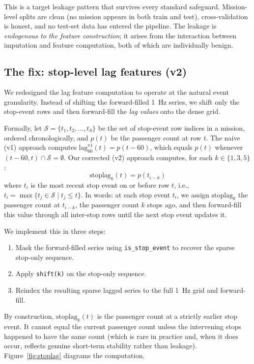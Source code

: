 This is a target leakage pattern that survives every standard safeguard.
Mission-level splits are clean (no mission appears in both train and test),
cross-validation is honest, and no test-set data has entered the pipeline.
The leakage is \emph{endogenous to the feature construction}; it arises
from the interaction between imputation and feature computation, both of
which are individually benign.

\subsection{The fix: stop-level lag features (v2)}
\label{sec:methods-v2}

We redesigned the lag feature computation to operate at the natural event
granularity. Instead of shifting the forward-filled 1~Hz series, we shift
only the stop-event rows and then forward-fill the \emph{lag values} onto
the dense grid.

Formally, let $\mathcal{S} = \{t_1, t_2, \ldots, t_S\}$ be the set of
stop-event row indices in a mission, ordered chronologically, and $p(t)$
be the passenger count at row $t$. The naive (v1) approach computes
$\text{lag}_{60}^{\text{v1}}(t) = p(t - 60)$, which equals $p(t)$ whenever
$(t - 60, t) \cap \mathcal{S} = \emptyset$. Our corrected (v2) approach
computes, for each $k \in \{1, 3, 5\}$:
\begin{equation}
  \text{stoplag}_k(t) = p(t_{i - k})
\end{equation}
where $t_i$ is the most recent stop event on or before row $t$, i.e.,
$t_i = \max\{t_j \in \mathcal{S} \mid t_j \le t\}$. In words: at each stop
event $t_i$, we assign $\text{stoplag}_k$ the passenger count at
$t_{i-k}$, the passenger count $k$ stops ago, and then forward-fill
this value through all inter-stop rows until the next stop event updates
it.

We implement this in three steps:
\begin{enumerate}
  \item Mask the forward-filled series using \texttt{is\_stop\_event} to
    recover the sparse stop-only sequence.
  \item Apply \texttt{shift(k)} on the stop-only sequence.
  \item Reindex the resulting sparse lagged series to the full 1~Hz grid
    and forward-fill.
\end{enumerate}

By construction, $\text{stoplag}_k(t)$ is the passenger count at a strictly
earlier stop event. It cannot equal the current passenger count unless the
intervening stops happened to have the same count (which is rare in practice
and, when it does occur, reflects genuine short-term stability rather than
leakage). Figure~\ref{fig:stoplag} diagrams the computation.

